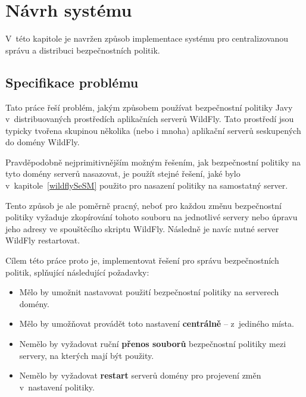 \chapter{Návrh systému} \label{navrh}

V~této kapitole je navržen způsob implementace systému pro centralizovanou správu a distribuci bezpečnostních politik.

\section{Specifikace problému} \label{specifikaceProblemu}

Tato práce řeší problém, jakým způsobem používat bezpečnostní politiky Javy v~distribuovaných prostředích aplikačních serverů WildFly.
Tato prostředí jsou typicky tvořena skupinou několika (nebo i mnoha) aplikační serverů seskupených do domény WildFly.

Pravděpodobně nejprimitivnějším možným řešením, jak bezpečnostní politiky na tyto domény serverů nasazovat, je použít stejné řešení, jaké bylo v~kapitole~\ref{wildflySeSM} použito pro nasazení politiky na samostatný server.

Tento způsob je ale poměrně pracný, neboť pro každou změnu bezpečnostní politiky vyžaduje zkopírování tohoto souboru na jednotlivé servery nebo úpravu jeho adresy ve spouštěcího skriptu WildFly. Následně je navíc nutné server WildFly restartovat.

Cílem této práce proto je, implementovat řešení pro správu bezpečnostních politik, splňující následující požadavky:

\begin{itemize}
  \item Mělo by umožnit nastavovat použití bezpečnostní politiky na serverech domény.
  \item Mělo by umožňovat provádět toto nastavení {\bf centrálně} -- z~jediného místa.
  \item Nemělo by vyžadovat ruční {\bf přenos souborů} bezpečnostní politiky mezi servery, na kterých mají být použity.
  \item Nemělo by vyžadovat {\bf restart} serverů domény pro projevení změn v~nastavení politiky.
\end{itemize}


